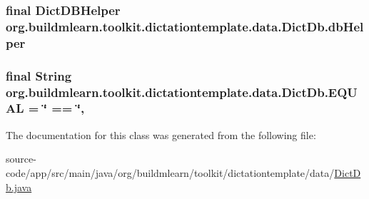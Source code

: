 \subsubsection[{\texorpdfstring{db\+Helper}{dbHelper}}]{\setlength{\rightskip}{0pt plus 5cm}final Dict\+D\+B\+Helper org.\+buildmlearn.\+toolkit.\+dictationtemplate.\+data.\+Dict\+Db.\+db\+Helper\hspace{0.3cm}{\ttfamily [private]}}\hypertarget{classorg_1_1buildmlearn_1_1toolkit_1_1dictationtemplate_1_1data_1_1DictDb_aa1fc68089b8e66689f73307128f506e9}{}\label{classorg_1_1buildmlearn_1_1toolkit_1_1dictationtemplate_1_1data_1_1DictDb_aa1fc68089b8e66689f73307128f506e9}
\subsubsection[{\texorpdfstring{E\+Q\+U\+AL}{EQUAL}}]{\setlength{\rightskip}{0pt plus 5cm}final String org.\+buildmlearn.\+toolkit.\+dictationtemplate.\+data.\+Dict\+Db.\+E\+Q\+U\+AL = \char`\"{} == \char`\"{}\hspace{0.3cm}{\ttfamily [static]}, {\ttfamily [private]}}\hypertarget{classorg_1_1buildmlearn_1_1toolkit_1_1dictationtemplate_1_1data_1_1DictDb_a9db39040e80c78319afaa83652fb2008}{}\label{classorg_1_1buildmlearn_1_1toolkit_1_1dictationtemplate_1_1data_1_1DictDb_a9db39040e80c78319afaa83652fb2008}


The documentation for this class was generated from the following file\+:\begin{DoxyCompactItemize}
\item 
source-\/code/app/src/main/java/org/buildmlearn/toolkit/dictationtemplate/data/\hyperlink{DictDb_8java}{Dict\+Db.\+java}\end{DoxyCompactItemize}
